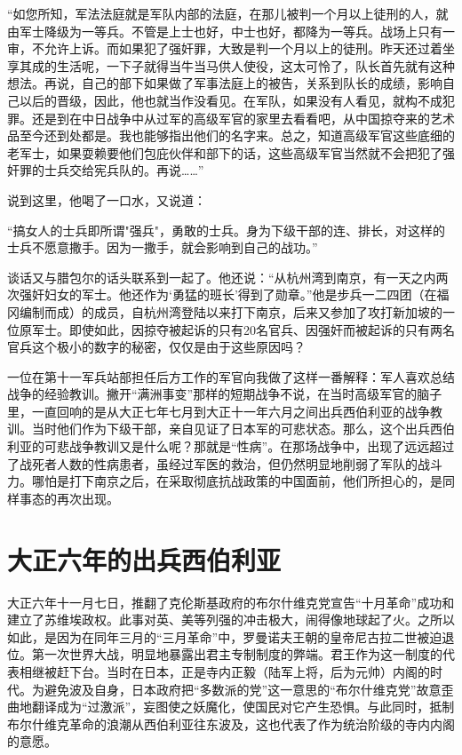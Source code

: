 \documentclass[12pt,UTF8]{ctexbook}
\begin{document}
“如您所知，军法法庭就是军队内部的法庭，在那儿被判一个月以上徒刑的人，就由军士降级为一等兵。不管是上士也好，中士也好，都降为一等兵。战场上只有一审，不允许上诉。而如果犯了强奸罪，大致是判一个月以上的徒刑。昨天还过着坐享其成的生活呢，一下子就得当牛当马供人使役，这太可怜了，队长首先就有这种想法。再说，自己的部下如果做了军事法庭上的被告，关系到队长的成绩，影响自己以后的晋级，因此，他也就当作没看见。在军队，如果没有人看见，就构不成犯罪。还是到在中日战争中从过军的高级军官的家里去看看吧，从中国掠夺来的艺术品至今还到处都是。我也能够指出他们的名字来。总之，知道高级军官这些底细的老军士，如果耍赖要他们包庇伙伴和部下的话，这些高级军官当然就不会把犯了强奸罪的士兵交给宪兵队的。再说……”

说到这里，他喝了一口水，又说道：

“搞女人的士兵即所谓"强兵"，勇敢的士兵。身为下级干部的连、排长，对这样的士兵不愿意撒手。因为一撒手，就会影响到自己的战功。”

谈话又与腊包尔的话头联系到一起了。他还说：“从杭州湾到南京，有一天之内两次强奸妇女的军士。他还作为‘勇猛的班长’得到了勋章。”他是步兵一二四团（在福冈编制而成）的成员，自杭州湾登陆以来打下南京，后来又参加了攻打新加坡的一位原军士。即使如此，因掠夺被起诉的只有20名官兵、因强奸而被起诉的只有两名官兵这个极小的数字的秘密，仅仅是由于这些原因吗？

一位在第十一军兵站部担任后方工作的军官向我做了这样一番解释：军人喜欢总结战争的经验教训。撇开“满洲事变”那样的短期战争不说，在当时高级军官的脑子里，一直回响的是从大正七年七月到大正十一年六月之间出兵西伯利亚的战争教训。当时他们作为下级干部，亲自见证了日本军的可悲状态。那么，这个出兵西伯利亚的可悲战争教训又是什么呢？那就是“性病”。在那场战争中，出现了远远超过了战死者人数的性病患者，虽经过军医的救治，但仍然明显地削弱了军队的战斗力。哪怕是打下南京之后，在采取彻底抗战政策的中国面前，他们所担心的，是同样事态的再次出现。

\section{大正六年的出兵西伯利亚}

大正六年十一月七日，推翻了克伦斯基政府的布尔什维克党宣告“十月革命”成功和建立了苏维埃政权。此事对英、美等列强的冲击极大，闹得像地球起了火。之所以如此，是因为在同年三月的“三月革命”中，罗曼诺夫王朝的皇帝尼古拉二世被迫退位。第一次世界大战，明显地暴露出君主专制制度的弊端。君王作为这一制度的代表相继被赶下台。当时在日本，正是寺内正毅（陆军上将，后为元帅）内阁的时代。为避免波及自身，日本政府把“多数派的党”这一意思的“布尔什维克党”故意歪曲地翻译成为“过激派”，妄图使之妖魔化，使国民对它产生恐惧。与此同时，抵制布尔什维克革命的浪潮从西伯利亚往东波及，这也代表了作为统治阶级的寺内内阁的意愿。
\end{document}
